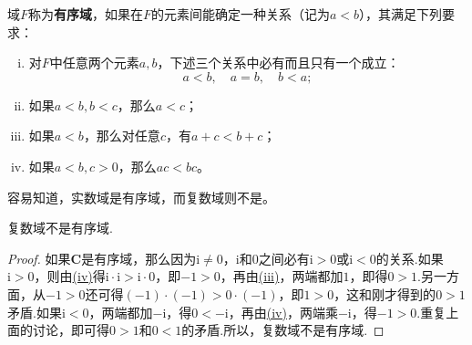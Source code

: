 \documentclass[../../main.tex]{subfiles}
\begin{document}
\begin{definition}[有序域]
域\(F\)称为\textbf{有序域}，如果在\(F\)的元素间能确定一种关系（记为\(a < b\)），其满足下列要求：
\begin{enumerate}[(i)]
\item\label{有序域:(i)} 对\(F\)中任意两个元素\(a,b\)，下述三个关系中必有而且只有一个成立：
\[
a < b, \quad a = b, \quad b < a;
\]

\item\label{有序域:(ii)} 如果\(a < b, b < c\)，那么\(a < c\)；

\item\label{有序域:(iii)} 如果\(a < b\)，那么对任意\(c\)，有\(a + c < b + c\)；

\item\label{有序域:(iv)} 如果\(a < b, c > 0\)，那么\(ac < bc\)。
\end{enumerate}
\end{definition}
\begin{note}
容易知道，实数域是有序域，而复数域则不是。
\end{note}

\begin{theorem}\label{theorem:复数域不是有序域}
复数域不是有序域.
\end{theorem}
\begin{proof}
如果\(\mathbf{C}\)是有序域，那么因为\(\mathrm{i} \neq 0\)，\(\mathrm{i}\)和\(0\)之间必有\(\mathrm{i} > 0\)或\(\mathrm{i} < 0\)的关系.如果\(\mathrm{i} > 0\)，则由\hyperref[有序域:(iv)]{(iv)}得\(\mathrm{i} \cdot \mathrm{i} > \mathrm{i} \cdot 0\)，即\(-1 > 0\)，再由\hyperref[有序域:(iii)]{(iii)}，两端都加\(1\)，即得\(0 > 1\).另一方面，从\(-1 > 0\)还可得\((-1) \cdot (-1) > 0 \cdot (-1)\)，即\(1 > 0\)，这和刚才得到的\(0 > 1\)矛盾.如果\(\mathrm{i} < 0\)，两端都加\(-\mathrm{i}\)，得\(0 < -\mathrm{i}\)，再由\hyperref[有序域:(iv)]{(iv)}，两端乘\(-\mathrm{i}\)，得\(-1 > 0\).重复上面的讨论，即可得\(0 > 1\)和\(0 < 1\)的矛盾.所以，复数域不是有序域. 
\end{proof}
\end{document}
